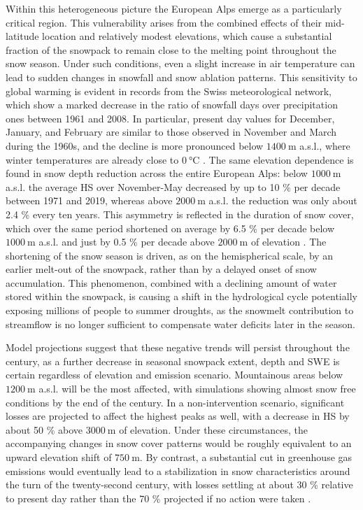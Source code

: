 Within this heterogeneous picture the European Alps emerge as a particularly critical region. This vulnerability arises from the combined effects of 
their mid-latitude location and relatively modest elevations, which cause a substantial fraction of the snowpack to remain close to the melting point 
throughout the snow season. Under such conditions, even a slight increase in air temperature can lead to sudden changes in snowfall and snow ablation 
patterns. This sensitivity to global warming is evident in records from the Swiss meteorological network, which show a marked decrease in the ratio of 
snowfall days over precipitation ones between 1961 and 2008. In particular, present day values for December, January, and February are similar to those observed in 
November and March during the 1960s, and the decline is more pronounced below $\SI{1400}{\meter}$ a.s.l., where winter temperatures are already 
close to $\SI{0}{\degreeCelsius}$ \parencite{snow_days_ratio}. The same elevation dependence is found in snow depth reduction across the entire European Alps: 
below $\SI{1000}{\meter}$ a.s.l. the average HS over November-May decreased by up to \num{10} \% per decade between 1971 and 2019, whereas above 
$\SI{2000}{\meter}$ a.s.l. the reduction was only about \num{2.4} \% every ten years. This asymmetry is reflected in the duration of snow cover, which over the 
same period shortened on average by \num{6.5} \% per decade below $\SI{1000}{\meter}$ a.s.l. and just by \num{0.5} \% per decade above 
$\SI{2000}{\meter}$ of elevation \parencite{Matiu_HS}. The shortening of the snow season is driven, as on the hemispherical scale, by an earlier 
melt-out of the snowpack, rather than by a delayed onset of snow accumulation. This phenomenon, combined with a declining amount of water stored 
within the snowpack, is causing a shift in the hydrological cycle potentially exposing millions of people to summer droughts, as the snowmelt 
contribution to streamflow is no longer sufficient to compensate water deficits later in the season.

Model projections suggest that these negative trends will persist throughout the century, as a further decrease in seasonal snowpack extent, depth 
and SWE is certain regardless of elevation and emission scenario. Mountainous areas below  $\SI{1200}{\meter}$ a.s.l.  will be the most affected, with 
simulations showing almost snow free conditions by the end of the century. In a non-intervention scenario, significant losses are projected to 
affect the highest peaks as well, with a decrease in HS by about \num{50} \% above $\SI{3000}{\meter}$ of elevation. Under these circumstances, the 
accompanying changes in snow cover patterns would be roughly equivalent to an upward elevation shift of $\SI{750}{\meter}$. By contrast, a 
substantial cut in greenhouse gas emissions would eventually lead to a stabilization in snow characteristics around the turn of the twenty-second 
century, with losses settling at about \num{30} \% relative to present day rather than the \num{70} \% projected if no action were taken 
\parencite{snow_future_proj}.